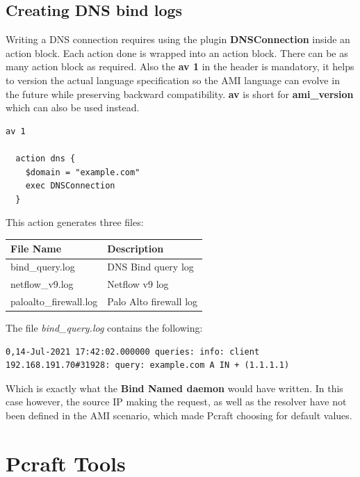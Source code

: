 \documentclass[10pt]{article}
\begin{document}
\subsection{Creating DNS bind logs}

Writing a DNS connection requires using the plugin \textbf{DNSConnection} inside an action block. Each action done is wrapped into an action block. There can be as many action block as required. Also the \textbf{av 1} in the header is mandatory, it helps to version the actual language specification so the AMI language can evolve in the future while preserving backward compatibility. \textbf{av} is short for \textbf{ami\_version} which can also be used instead.

\begin{lstlisting}[caption={AMI file to create DNS bind logs},captionpos=b]
  av 1

  action dns {
    $domain = "example.com"
    exec DNSConnection
  }  
\end{lstlisting}

This action generates three files:

\begin{center}
\begin{tabular}{|l|l|}
  \hline
  \textbf{File Name} & \textbf{Description} \\
  \hline
 bind\_query.log & DNS Bind query log\\
  \hline
 netflow\_v9.log & Netflow v9 log\\
  \hline
 paloalto\_firewall.log & Palo Alto firewall log\\
  \hline
\end{tabular}
\end{center}

\vspace{1em}

The file \textit{bind\_query.log} contains the following:
\begin{lstlisting}[caption={bind\_query.log output},captionpos=b]
  0,14-Jul-2021 17:42:02.000000 queries: info: client 192.168.191.70#31928: query: example.com A IN + (1.1.1.1)  
\end{lstlisting}

Which is exactly what the \textbf{Bind Named daemon} would have written. In this case however, the source IP making the request, as well as the resolver have not been defined in the AMI scenario, which made Pcraft choosing for default values.

\section{Pcraft Tools}
\end{document}
